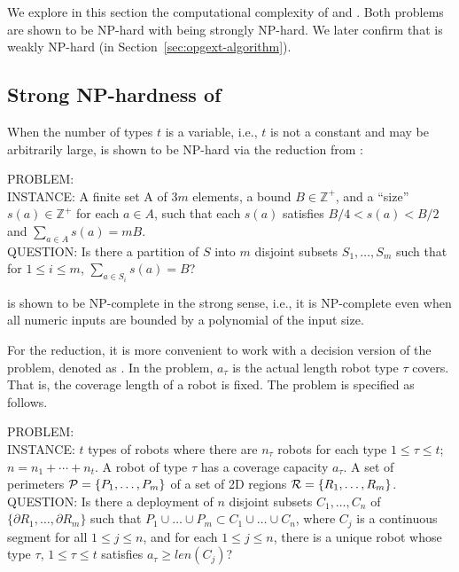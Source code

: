 We explore in this section the computational complexity of \opglr 
and \opgmc. Both problems are shown to be NP-hard with \opglr 
being strongly NP-hard. We later confirm that \opgmc is weakly 
NP-hard (in Section~\ref{sec:opgext-algorithm}).

\subsection{Strong NP-hardness of \opglr}\label{subsec:opgext-opglr-hardness}
When the number of types $t$ is a variable, i.e., $t$ is not a constant
and may be arbitrarily large,
\opglr is shown to be NP-hard via the reduction from \tpart \cite{garey1975complexity}:

\vspace*{1mm}
\noindent
PROBLEM: \tpart\\
INSTANCE: A finite set A of $3m$ elements, a bound $B\in \mathbb{Z^+}$, 
and a ``size'' $s(a)\in \mathbb{Z^+}$ for each $a\in A$,
such that each $s(a)$ satisfies $B/4 < s(a) <B/2$ and $\sum_{a\in A} s(a) = mB$.\\
QUESTION: Is there a partition of $S$ into $m$ disjoint subsets $S_1, 
\ldots, S_m$ such that for $1\leq i\leq m$, 
$\sum_{a\in S_i} s(a) = B$?
\vspace*{1mm}

\tpart is shown to be NP-complete in the strong sense\cite{garey1979computers}, 
i.e., it is NP-complete even when all numeric inputs are bounded by a polynomial 
of the input size. 

For the reduction, it is more convenient to work with a decision 
version of the \opglr problem, denoted as \opglrd. In the \opglrd 
problem, $a_{\tau}$ is the actual length robot type $\tau$ covers. 
That is, the coverage length of a robot is fixed. The \opglrd problem 
is specified as follows. 

\vspace*{1mm}
\noindent
PROBLEM: \opglrd\\
INSTANCE: $t$ types of robots where there are $n_{\tau}$ robots for 
each type $1 \le \tau \le t$; $n = n_1 + \cdots + n_t$. A robot of 
type $\tau$ has a coverage capacity $a_{\tau}$. A set of perimeters 
$\P = \{P_1, \ldots, P_m\}$ of a set of 2D regions 
$\R =\{R_1, \ldots, R_m\}$.\\ 
QUESTION: Is there a deployment of $n$ disjoint subsets $C_1, \ldots, C_n$
of $\{\partial R_1, \ldots, \partial R_m\}$ such that 
$P_1 \cup \ldots \cup P_m \subset C_1 \cup \ldots \cup C_n$, where
$C_j$ is a continuous segment for all $1 \le j \le n$, and for each 
$1 \le j \le n$, there is a unique robot whose type $\tau$, $1 \le \tau 
\le t$ satisfies $a_{\tau} \ge len(C_j)$?
\vspace*{1mm}

